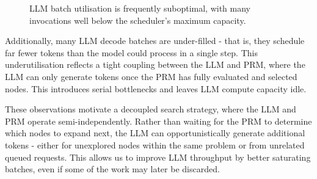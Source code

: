 \documentclass[11pt,twoside]{report}
\begin{document}
\begin{figure}[htbp]
\centering
{}
\vspace{1em}
\caption{LLM batch utilisation is frequently suboptimal, with many invocations well below the scheduler’s maximum capacity.}
\label{fig:batch-utilisation-comparison}
\end{figure}

Additionally, many LLM decode batches are under-filled - that is, they schedule far fewer tokens than the model could process in a single step. 
This underutilisation reflects a tight coupling between the LLM and PRM, where the LLM can only generate tokens once the PRM has fully evaluated and selected nodes. 
This introduces serial bottlenecks and leaves LLM compute capacity idle.

These observations motivate a decoupled search strategy, where the LLM and PRM operate semi-independently. 
Rather than waiting for the PRM to determine which nodes to expand next, the LLM can opportunistically generate additional tokens - either for unexplored nodes within the same problem or from unrelated queued requests. 
This allows us to improve LLM throughput by better saturating batches, even if some of the work may later be discarded.
\end{document}
